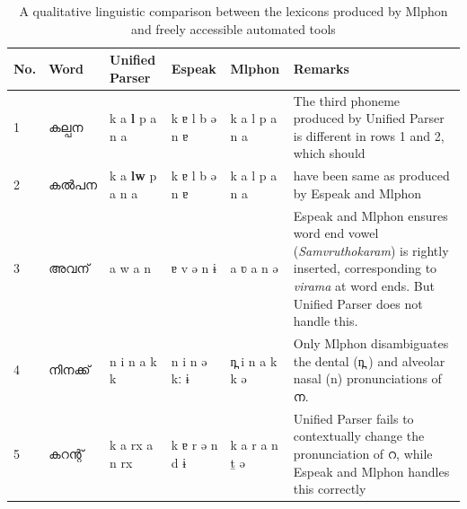 \begin{table}[htpb]
	\caption{A qualitative linguistic comparison between the lexicons produced by Mlphon and freely accessible automated tools}
	\label{tab:lexiconcomparison}
	\begin{tabular}{@{}p{0.3cm}p{1.2cm}p{2.2cm}p{1.8cm}p{2cm}p{5.5cm}@{}}
		\hline \hline
		No. & Word        & Unified Parser                 & Espeak               & Mlphon               & Remarks                                                                                                                                                                         \\
		\hline
		1   & {\mal കല്പന} & {\ipa k a \textbf{l} p a n a}  & {\ipa k ɐ l b ə n ɐ} & {\ipa k a l p a n a} & The third phoneme produced by Unified Parser is different in rows 1 and 2, which should                                                                                         \\
		2   & {\mal കൽപന} & {\ipa k a \textbf{lw} p a n a} & {\ipa k ɐ l b ə n ɐ} & {\ipa k a l p a n a} & have been same as produced by Espeak and Mlphon                                                                                                                                 \\ \hline

		3   & {\mal അവന്}  & {\ipa a w a n}                 & {\ipa ɐ v ə n ɨ}     & {\ipa	a ʋ a n ə}     & Espeak and Mlphon ensures word end vowel (\textit{Samvruthokaram}) is rightly inserted, corresponding to \textit{virama} at word ends. But Unified Parser does not handle this. \\ \hline
		4   & {\mal നിനക്ക്} & {\ipa n i n a k k}             & {\ipa n i n ə kː ɨ}  & {\ipa	n̪ i n a k k ə} & Only Mlphon disambiguates the dental ({\ipa	n̪} ) and alveolar nasal ({\ipa	n}) pronunciations of {\mal ന}.                                                                      \\\hline
		5   & {\mal കറന്റ്} & {\ipa k a rx a n rx}           & {\ipa k ɐ r ə n d ɨ} & {\ipa k a r a n ṯ ə} & Unified Parser fails to contextually change the pronunciation of {\mal റ}, while Espeak and Mlphon handles this correctly                                                       \\
		\hline
	\end{tabular}
\end{table}

